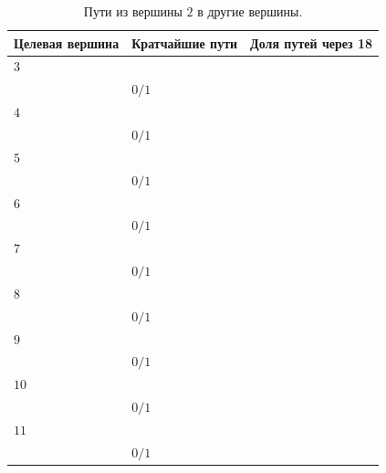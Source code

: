 \documentclass[12pt, a4paper]{extarticle}
\begin{document}
\begin{table}[h!]
    \caption{Пути из вершины $2$ в другие вершины.}
    \label{tbl:10-2}
    \begin{tabularx}{\textwidth}{|X|X|X|}
        \hline 
        Целевая вершина & Кратчайшие пути & Доля путей через 18 \\
        \hline 
        $3$ & \begin{tabular}{@{}l@{}} $[2, 3]$ \\ \end{tabular} & $0/1$ \\
        \hline
        $4$ & \begin{tabular}{@{}l@{}} $[2, 3, 6, 4]$ \\ \end{tabular} & $0/1$ \\
        \hline
        $5$ & \begin{tabular}{@{}l@{}} $[2, 3, 6, 5]$ \\ \end{tabular} & $0/1$ \\
        \hline
        $6$ & \begin{tabular}{@{}l@{}} $[2, 3, 6]$ \\ \end{tabular} & $0/1$ \\
        \hline
        $7$ & \begin{tabular}{@{}l@{}} $[2, 3, 7]$ \\ \end{tabular} & $0/1$ \\
        \hline
        $8$ & \begin{tabular}{@{}l@{}} $[2, 3, 7, 8]$ \\ \end{tabular} & $0/1$ \\
        \hline
        $9$ & \begin{tabular}{@{}l@{}} $[2, 3, 9]$ \\ \end{tabular} & $0/1$ \\
        \hline
        $10$ & \begin{tabular}{@{}l@{}} $[2, 3, 6, 10]$ \\ \end{tabular} & $0/1$ \\
        \hline
        $11$ & \begin{tabular}{@{}l@{}} $[2, 3, 6, 10, 11]$ \\ \end{tabular} & $0/1$ \\

\end{tabularx}
\end{table}
\end{document}
